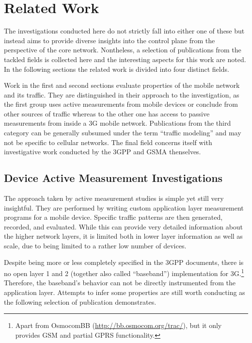 \section{Related Work}
\label{c4:sec:relwork}

The investigations conducted here do not strictly fall into either one of these but instead aims to provide diverse insights into the control plane from the perspective of the core network. Nontheless, a selection of publications from the tackled fields is collected here and the interesting aspects for this work are noted. In the following sections the related work is divided into four distinct fields.

Work in the first and second sections evaluate properties of the mobile network and its traffic. They are distinguished in their approach to the investigation, as the first group uses active measurements from mobile devices or conclude from other sources of traffic whereas to the other one has access to passive measurements from inside a \gls{3G} mobile network. Publications from the third category can be generally subsumed under the term ``traffic modeling'' and may not be specific to cellular networks. The final field concerns itself with investigative work conducted by the \gls{3GPP} and \gls{GSMA} thenselves.


\subsection{Device Active Measurement Investigations}

The approach taken by active measurement studies is simple yet still very insightful. They are performed by writing custom application layer measurement programs for a mobile device. Specific traffic patterns are then generated, recorded, and evaluated. While this can provide very detailed information about the higher network layers, it is limited both in lower layer information as well as scale, due to being limited to a rather low number of devices.

Despite being more or less completely specified in the \gls{3GPP} documents, there is no open layer 1 and 2 (together also called ``baseband'') implementation for \gls{3G}.\footnote{Apart from OsmocomBB (\url{http://bb.osmocom.org/trac/}), but it only provides \gls{GSM} and partial \gls{GPRS} functionality.} Therefore, the baseband's behavior can not be directly instrumented from the application layer. Attempts to infer some properties are still worth conducting as the following selection of publication demonstrates.

